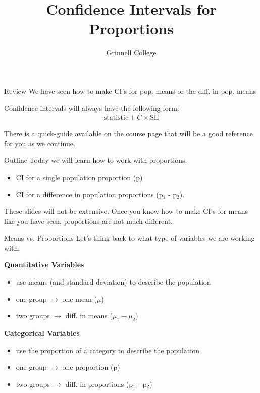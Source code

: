 \documentclass{beamer}
\title[Introduction to Statistics]{Confidence Intervals for Proportions}
\subtitle{}
\author{Grinnell College}
\date{}
\begin{document}
\begin{frame}
  \titlepage
\end{frame}

\begin{frame}{Review}
We have seen how to make CI's for pop. means or the diff. in pop. means \vspace{6mm}

Confidence intervals will always have the following form:
\begin{align*}
    \text{statistic} \pm C \times \text{SE}
\end{align*} \vspace{6mm}

There is a quick-guide available on the course page that will be a good reference for you as we continue.
\end{frame}

\begin{frame}{Outline}
Today we will learn how to work with proportions.
\begin{itemize}
    \item CI for a single population proportion (p)
    \item CI for a difference in population proportions (p$_1$ - p$_2$).
\end{itemize} \vspace{6mm}

These slides will not be extensive. Once you know how to make CI's for means like you have seen, proportions are not much different.
\end{frame}

\begin{frame}{Means vs. Proportions}
Let's think back to what type of variables we are working with. \vspace{6mm}

\textbf{Quantitative Variables}
\begin{itemize}
    \item use means (and standard deviation) to describe the population
    \item one group $\rightarrow$ one mean ($\mu$)
    \item two groups $\rightarrow$ diff. in means ($\mu_1 - \mu_2$)
\end{itemize} \vspace{6mm}

\textbf{Categorical Variables}
\begin{itemize}
    \item use the proportion of a category to describe the population
    \item one group $\rightarrow$ one proportion (p)
    \item two groups $\rightarrow$ diff. in proportions (p$_1$ - p$_2$)
\end{itemize}
\end{frame}
\end{document}
